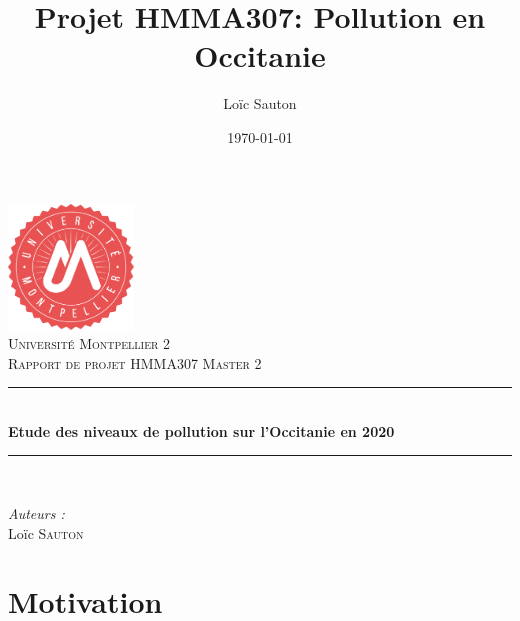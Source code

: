 \documentclass[a4paper,11pt,twoside,openright]{report}
\title{Projet HMMA307: Pollution en Occitanie}
\author{Loïc Sauton}
\date{\today}
\theoremstyle{plain}
\theoremstyle{definition}
\theoremstyle{remark}
\newcommand{\HRule}{\rule{\linewidth}{0.5mm}}
\begin{document}
\pagestyle{empty}
\begin{titlepage}
  \begin{center}
    \vspace*{-2cm}
    \includegraphics[width=0.25\textwidth]{Logo.pdf}\\[1cm]

    \textsc{\LARGE Université Montpellier 2}\\[1.5cm]

    \textsc{\Large Rapport de projet HMMA307 Master 2}\\[1.5cm]

    \HRule\\[0.4cm]

    {\huge \textbf{Etude des niveaux de pollution sur l'Occitanie en 2020}}\\[0.4cm]
    
    \HRule\\[1.5cm]
    
    \vfill
    \begin{minipage}{0.4\textwidth}
      \begin{flushleft}
        \large
        \emph{Auteurs :}\\
        Loïc \textsc{Sauton}\\
      \end{flushleft}
    \end{minipage}
  \end{center}
\end{titlepage}

\pagestyle{empty}

\chapter*{Motivation}
\end{document}
